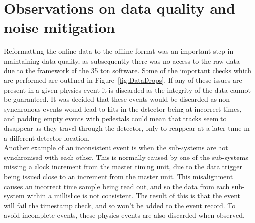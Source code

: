 \section{Observations on data quality and noise mitigation} \label{sec:AllTheNoise} %
Reformatting the online data to the offline format was an important step in maintaining data quality, as subsequently there was no access to the raw data due to the framework of the 35 ton software. Some of the important checks which are performed are outlined in Figure~\ref{fig:DataDrops}. If any of these issues are present in a given physics event it is discarded as the integrity of the data cannot be guaranteed. It was decided that these events would be discarded as non-synchronous events would lead to hits in the detector being at incorrect times, and padding empty events with pedestals could mean that tracks seem to disappear as they travel through the detector, only to reappear at a later time in a different detector location. \\

Another example of an inconsistent event is when the sub-systems are not synchronised with each other. This is normally caused by one of the sub-systems missing a clock increment from the master timing unit, due to the data trigger being issued close to an increment from the master unit. This misalignment causes an incorrect time sample being read out, and so the data from each sub-system within a millislice is not consistent. The result of this is that the event will fail the timestamp check, and so won't be added to the event record. To avoid incomplete events, these physics events are also discarded when observed. \\

